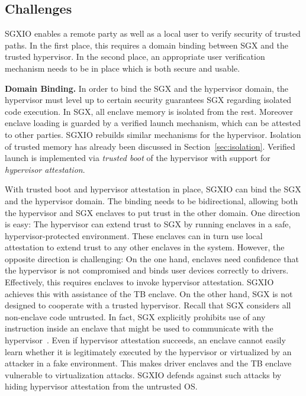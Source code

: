\documentclass{sig-alternate-05-2015}
\begin{document}
\subsection{Challenges}

SGXIO enables a remote party as well as a local user to verify security of trusted paths. 
In the first place, this requires a domain binding between SGX and the trusted hypervisor. 
In the second place, an appropriate user verification mechanism needs to be in place which is both secure and usable.


\textbf{Domain Binding.}
In order to bind the SGX and the hypervisor domain, the hypervisor must level up to certain security guarantees SGX regarding isolated code execution. 
In SGX, all enclave memory is isolated from the rest. 
Moreover enclave loading is guarded by a verified launch mechanism, which can be attested to other parties. 
SGXIO  rebuilds similar mechanisms for the hypervisor. 
Isolation of trusted memory has already been discussed in Section~\ref{sec:isolation}. 
Verified launch is implemented via \emph{trusted boot} of the hypervisor with support for \emph{hypervisor attestation}. 

With trusted boot and hypervisor attestation in place, SGXIO can bind the SGX and the hypervisor domain. 
The binding needs to be bidirectional, allowing both the hypervisor and SGX enclaves to put trust in the other domain. 
One direction is easy: The hypervisor can extend trust to SGX by running enclaves in a safe, hypervisor-protected environment. 
These enclaves can in turn use local attestation to extend trust to any other enclaves in the system. 
However, the opposite direction is challenging: 
On the one hand, enclaves need confidence that the hypervisor is not compromised and binds user devices correctly to drivers. 
Effectively, this requires enclaves to invoke hypervisor attestation. 
SGXIO achieves this with assistance of the TB enclave.
On the other hand, SGX is not designed to cooperate with a trusted hypervisor. 
Recall that SGX considers all non-enclave code untrusted. 
In fact, SGX explicitly prohibits use of any instruction inside an enclave that might be used to communicate with the hypervisor~\cite{sgxdevguide}. 
Even if hypervisor attestation succeeds, an enclave cannot easily learn whether it is legitimately executed by the hypervisor or virtualized by an attacker in a fake environment. 
This makes driver enclaves and the TB enclave vulnerable to virtualization attacks. 
SGXIO defends against such attacks by hiding hypervisor attestation from the untrusted OS.
\end{document}
